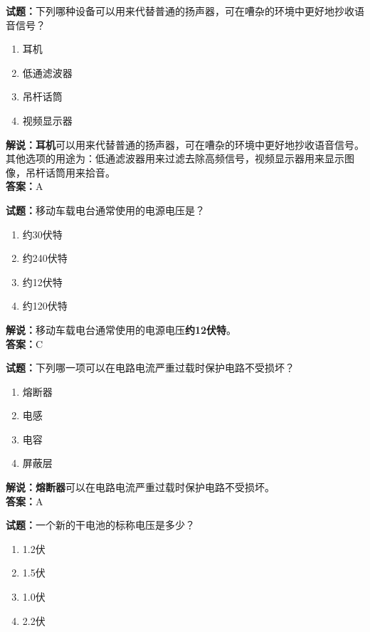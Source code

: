 \documentclass{ctexbook}
\begin{document}
\bigskip


\noindent\textbf{试题：}下列哪种设备可以用来代替普通的扬声器，可在嘈杂的环境中更好地抄收语音信号？

\begin{enumerate}[leftmargin=3em]
	\item 耳机
	\item 低通滤波器
	\item 吊杆话筒
	\item 视频显示器
\end{enumerate}

\noindent\textbf{解说：耳机}可以用来代替普通的扬声器，可在嘈杂的环境中更好地抄收语音信号。其他选项的用途为：低通滤波器用来过滤去除高频信号，视频显示器用来显示图像，吊杆话筒用来拾音。\\\noindent\textbf{答案：}A

\bigskip


\noindent\textbf{试题：}移动车载电台通常使用的电源电压是？

\begin{enumerate}[leftmargin=3em]
	\item 约30伏特
	\item 约240伏特
	\item 约12伏特
	\item 约120伏特
\end{enumerate}

\noindent\textbf{解说：}移动车载电台通常使用的电源电压\textbf{约12伏特}。\\\noindent\textbf{答案：}C

\bigskip


\noindent\textbf{试题：}下列哪一项可以在电路电流严重过载时保护电路不受损坏？

\begin{enumerate}[leftmargin=3em]
	\item 熔断器
	\item 电感
	\item 电容
	\item 屏蔽层
\end{enumerate}

\noindent\textbf{解说：熔断器}可以在电路电流严重过载时保护电路不受损坏。\\\noindent\textbf{答案：}A
\bigskip


\noindent\textbf{试题：}一个新的干电池的标称电压是多少？

\begin{enumerate}[leftmargin=3em]
	\item 1.2伏
	\item 1.5伏
	\item 1.0伏
	\item 2.2伏
\end{enumerate}
\end{document}

